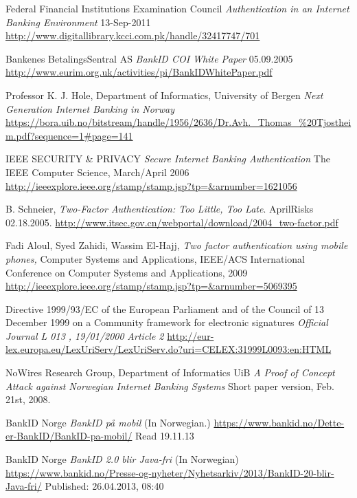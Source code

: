 \documentclass[a4paper,11pt]{article}
\begin{document}
\begin{thebibliography}{N}\label{sec:references}

 Federal Financial Institutions Examination Council  \textit{Authentication in an Internet Banking Environment} 13-Sep-2011 \url{http://www.digitallibrary.kcci.com.pk/handle/32417747/701}

 Bankenes BetalingsSentral AS \textit{BankID COI White Paper} 05.09.2005 \url{http://www.eurim.org.uk/activities/pi/BankIDWhitePaper.pdf}

  Professor K. J. Hole, Department of Informatics, University of
Bergen \textit{Next Generation Internet Banking in Norway} \url{https://bora.uib.no/bitstream/handle/1956/2636/Dr.Avh._Thomas_%20Tjostheim.pdf?sequence=1#page=141}

 IEEE SECURITY \& PRIVACY \textit{Secure Internet Banking Authentication} The IEEE Computer Science, March/April 2006 \url{http://ieeexplore.ieee.org/stamp/stamp.jsp?tp=&arnumber=1621056}

 B. Schneier, \textit{Two-Factor Authentication: Too Little, Too Late}. AprilRisks 02.18.2005. \url{http://www.itsec.gov.cn/webportal/download/2004_two-factor.pdf}

  Fadi Aloul, Syed Zahidi, Wassim El-Hajj, \textit{Two factor authentication using mobile phones,} Computer Systems and Applications, IEEE/ACS International Conference on Computer Systems and Applications, 2009 \url{http://ieeexplore.ieee.org/stamp/stamp.jsp?tp=&arnumber=5069395}

 Directive 1999/93/EC of the European Parliament and of the Council of 13 December 1999 on a Community framework for electronic signatures \textit{Official Journal L 013 , 19/01/2000} \emph{Article 2} \url{http://eur-lex.europa.eu/LexUriServ/LexUriServ.do?uri=CELEX:31999L0093:en:HTML}

NoWires Research Group, Department of Informatics UiB \textit{A Proof of Concept Attack against Norwegian Internet Banking Systems} Short paper version, Feb. 21st, 2008.

 BankID Norge \textit{BankID på mobil} (In Norwegian.) \url{https://www.bankid.no/Dette-er-BankID/BankID-pa-mobil/} Read 19.11.13

 BankID Norge \textit{BankID 2.0 blir Java-fri} (In Norwegian) \url{https://www.bankid.no/Presse-og-nyheter/Nyhetsarkiv/2013/BankID-20-blir-Java-fri/} Published: 26.04.2013, 08:40



\end{thebibliography}
\end{document}
